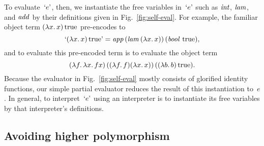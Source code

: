 To evaluate~$\encode{e}$, then, we
instantiate the free variables in~$\encode{e}$ such as $\ident{int}$,
$\ident{lam}$, and $\ident{add}$ by their definitions given in
Fig.~\ref{fig:self-eval}.  For
example, the familiar object term $(\fun{x}x)\True$ pre-encodes to
\begin{equation}
    \encode{(\fun{x}x)\True} = \ident{app}
    (\ident{lam} (\fun{x} x))\, (\ident{bool}\, \True),
\end{equation}
and to evaluate this pre-encoded term is to evaluate the object term
\begin{equation}
    (\fun{f} \fun{x} fx) \,
    ((\fun{f} f) (\fun{x} x))\, ((\fun{b} b) \True).
\end{equation}
Because the evaluator in Fig.~\ref{fig:self-eval} mostly consists 
of glorified identity
functions, our simple partial evaluator reduces the
result of this instantiation to~$e$.  In general, to
interpret~$\encode{e}$ using an interpreter is to instantiate its free
variables by that interpreter's definitions.

\subsection{Avoiding higher polymorphism}

